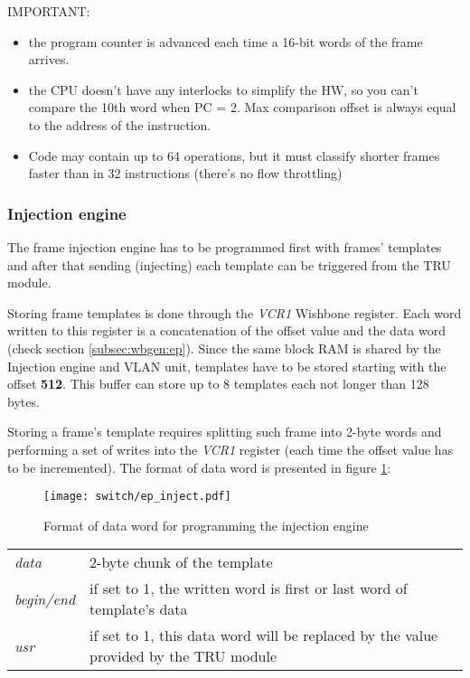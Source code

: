 IMPORTANT:
\begin{itemize}
  \item the program counter is advanced each time a 16-bit words of the frame arrives.
  \item the CPU doesn't have any interlocks to simplify the HW, so you can't
    compare the 10th word when PC = 2. Max comparison offset is always equal to
    the address of the instruction.
  \item Code may contain up to 64 operations, but it must classify shorter frames faster than in
  32 instructions (there's no flow throttling)
\end{itemize}

\subsubsection{Injection engine}
The frame injection engine has to be programmed first with frames' templates
and after that sending (injecting) each template can be triggered from the TRU
module.

Storing frame templates is done through the \emph{VCR1} Wishbone register. Each
word written to this register is a concatenation of the offset value and the data
word (check section \ref{subsec:wbgen:ep}). Since the same block RAM is shared
by the Injection engine and VLAN unit, templates have to be stored starting with
the offset {\bf 512}. This buffer can store up to 8 templates each not longer
than 128 bytes.

Storing a frame's template requires splitting such frame into 2-byte words and
performing a set of writes into the \emph{VCR1} register (each time the offset
value has to be incremented). The format of data word is presented in figure
\ref{fig:ep:inject_data}:
\begin{figure}[ht]
  \begin{center}
    \texttt{[image: switch/ep\_inject.pdf]}
    \caption{Format of data word for programming the injection engine}
    \label{fig:ep:inject_data}
  \end{center}
\end{figure}

\begin{tabular}{l p{13cm}}
  \emph{data} & 2-byte chunk of the template\\
  \emph{begin/end} & if set to 1, the written word is first or last word of
    template's data\\
  \emph{usr} & if set to 1, this data word will be replaced by the value
    provided by the TRU module\\
\end{tabular}
